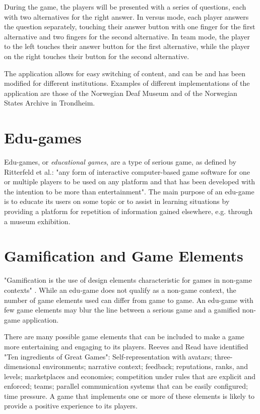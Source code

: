 During the game, the players will be presented with a series of questions, each with two alternatives for the right answer. In versus mode, each player answers the question separately, touching their answer button with one finger for the first alternative and two fingers for the second alternative. In team mode, the player to the left touches their answer button for the first alternative, while the player on the right touches their button for the second alternative.

The application allows for easy switching of content, and can be and has been modified for different institutions. Examples of different implementations of the application are those of the Norwegian Deaf Museum and of the Norwegian States Archive in Trondheim.


\section{Edu-games}

Edu-games, or \emph{educational games}, are a type of serious game, as defined by Ritterfeld et al.: "any form of interactive computer-based game software for one or multiple players to be used on any platform and that has been developed with the intention to be more than entertainment"\citep{Ritterfeld}. The main purpose of an edu-game is to educate its users on some topic or to assist in learning situations by providing a platform for repetition of information gained elsewhere, e.g. through a museum exhibition.


\section{Gamification and Game Elements}

"Gamification is the use of design elements characteristic for games in non-game contexts" \citep{Deterding}. While an edu-game does not qualify as a non-game context, the number of game elements used can differ from game to game. An edu-game with few game elements may blur the line between a serious game and a gamified non-game application.

There are many possible game elements that can be included to make a game more entertaining and engaging to its players. Reeves and Read have identified "Ten ingredients of Great Games"\citep{Reeves}: Self-representation with avatars; three-dimensional environments; narrative context; feedback; reputations, ranks, and levels; marketplaces and economies; competition under rules that are explicit and enforced; teams; parallel communication systems that can be easily configured; time pressure.  A game that implements one or more of these elements is likely to provide a positive experience to its players.